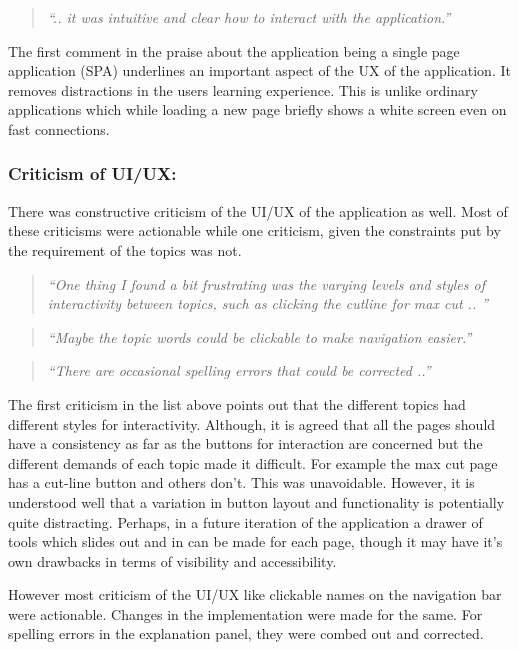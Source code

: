 \begin{quote}
\emph{``.. it was intuitive and clear how to
      interact with the application.''}
\end{quote}


The first comment in the praise about the application being a single page
application (SPA) underlines an important aspect of the UX of the application.
It removes distractions in the users learning experience. This is unlike
ordinary applications which while loading a new page briefly shows a white
screen even on fast connections.


\subsubsection{Criticism of UI/UX:}
There was constructive criticism of the UI/UX of the application as well.
Most of these criticisms were actionable while one criticism, given the
constraints put by the requirement of the topics was not.


\begin{quote}
\emph{``One thing I found a bit frustrating was the varying levels and styles of
interactivity between topics, such as clicking the cutline for max cut .. ''}
\end{quote}

\begin{quote}
\emph{``Maybe the topic words could be clickable to make navigation easier.''}
\end{quote}

\begin{quote}
\emph{``There are occasional spelling errors that
   could be corrected ..'' }
\end{quote}

The first criticism in the list above points out that the different topics had
different styles for interactivity.  Although, it is agreed that all the pages
should have a consistency as far as the buttons for interaction are concerned
but the different demands of each topic made it difficult.  For example the max
cut page has a cut-line button and others don't. This was unavoidable.
However, it is understood well that a variation in button layout and
functionality is potentially quite distracting. Perhaps, in a future iteration
of the application a drawer of tools which slides out and in can be made for
each page, though it may have it's own drawbacks in terms of visibility and
accessibility.

However most criticism of the UI/UX like clickable names on the navigation bar
were actionable. Changes in the implementation were made for the same. For
spelling errors in the explanation panel, they were combed out and corrected.


